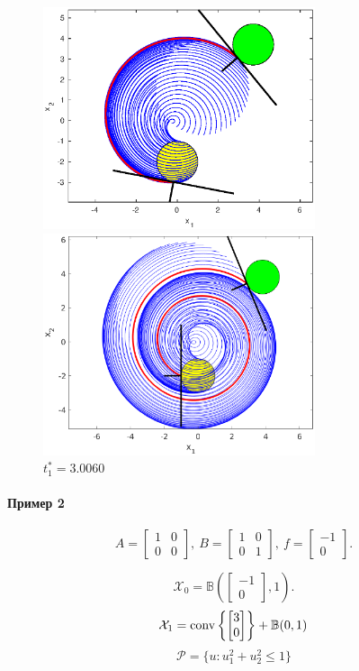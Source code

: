 \documentclass[11pt]{article}
\newcommand\PS{\mathcal{P}}
\newcommand\X{\mathcal{X}}
\newcommand\Cl[2]{\begin{bmatrix}
#1 \\ #2
\end{bmatrix}}
\newcommand\Conv[1]{{\rm conv}\left\{ #1 \right\}}
\begin{document}
\begin{figure}[h]
\begin{multicols}{2}
	\hfill
	\includegraphics[width=80mm]{3_1.eps}
	\hfill
	\caption{$t_1^* = 1.2680$}
	\hfill
	\includegraphics[width=80mm]{3_2.eps}
	\hfill
	\caption{$t_1^* = 3.0060$}
\end{multicols}
\end{figure}	

\newpage
\paragraph{Пример 2\\}
\begin{equation}
A = \begin{bmatrix}
1 & 0 \\ 0 & 0
\end{bmatrix},\ 
B = \begin{bmatrix}
1 & 0 \\ 0 & 1
\end{bmatrix}, \
f = \begin{bmatrix}
-1 \\ 0
\end{bmatrix}.
\end{equation}

$$\X_0 = \mathbb{B}\left(\Cl{-1}{0}, 1\right). $$
$$\X_1 = \Conv{\Cl{3}{0}} + \mathbb{B}(0, 1) $$
$$\PS = \{u\colon u_1^2 + u_2^2 \le 1\} $$
\end{document}
